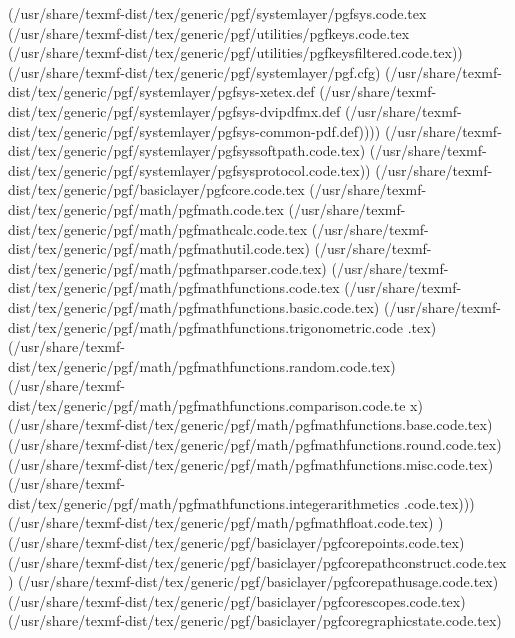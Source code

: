 (/usr/share/texmf-dist/tex/generic/pgf/systemlayer/pgfsys.code.tex
(/usr/share/texmf-dist/tex/generic/pgf/utilities/pgfkeys.code.tex
(/usr/share/texmf-dist/tex/generic/pgf/utilities/pgfkeysfiltered.code.tex))
(/usr/share/texmf-dist/tex/generic/pgf/systemlayer/pgf.cfg)
(/usr/share/texmf-dist/tex/generic/pgf/systemlayer/pgfsys-xetex.def
(/usr/share/texmf-dist/tex/generic/pgf/systemlayer/pgfsys-dvipdfmx.def
(/usr/share/texmf-dist/tex/generic/pgf/systemlayer/pgfsys-common-pdf.def))))
(/usr/share/texmf-dist/tex/generic/pgf/systemlayer/pgfsyssoftpath.code.tex)
(/usr/share/texmf-dist/tex/generic/pgf/systemlayer/pgfsysprotocol.code.tex))
(/usr/share/texmf-dist/tex/generic/pgf/basiclayer/pgfcore.code.tex
(/usr/share/texmf-dist/tex/generic/pgf/math/pgfmath.code.tex
(/usr/share/texmf-dist/tex/generic/pgf/math/pgfmathcalc.code.tex
(/usr/share/texmf-dist/tex/generic/pgf/math/pgfmathutil.code.tex)
(/usr/share/texmf-dist/tex/generic/pgf/math/pgfmathparser.code.tex)
(/usr/share/texmf-dist/tex/generic/pgf/math/pgfmathfunctions.code.tex
(/usr/share/texmf-dist/tex/generic/pgf/math/pgfmathfunctions.basic.code.tex)
(/usr/share/texmf-dist/tex/generic/pgf/math/pgfmathfunctions.trigonometric.code
.tex)
(/usr/share/texmf-dist/tex/generic/pgf/math/pgfmathfunctions.random.code.tex)
(/usr/share/texmf-dist/tex/generic/pgf/math/pgfmathfunctions.comparison.code.te
x) (/usr/share/texmf-dist/tex/generic/pgf/math/pgfmathfunctions.base.code.tex)
(/usr/share/texmf-dist/tex/generic/pgf/math/pgfmathfunctions.round.code.tex)
(/usr/share/texmf-dist/tex/generic/pgf/math/pgfmathfunctions.misc.code.tex)
(/usr/share/texmf-dist/tex/generic/pgf/math/pgfmathfunctions.integerarithmetics
.code.tex))) (/usr/share/texmf-dist/tex/generic/pgf/math/pgfmathfloat.code.tex)
) (/usr/share/texmf-dist/tex/generic/pgf/basiclayer/pgfcorepoints.code.tex)
(/usr/share/texmf-dist/tex/generic/pgf/basiclayer/pgfcorepathconstruct.code.tex
) (/usr/share/texmf-dist/tex/generic/pgf/basiclayer/pgfcorepathusage.code.tex)
(/usr/share/texmf-dist/tex/generic/pgf/basiclayer/pgfcorescopes.code.tex)
(/usr/share/texmf-dist/tex/generic/pgf/basiclayer/pgfcoregraphicstate.code.tex)

